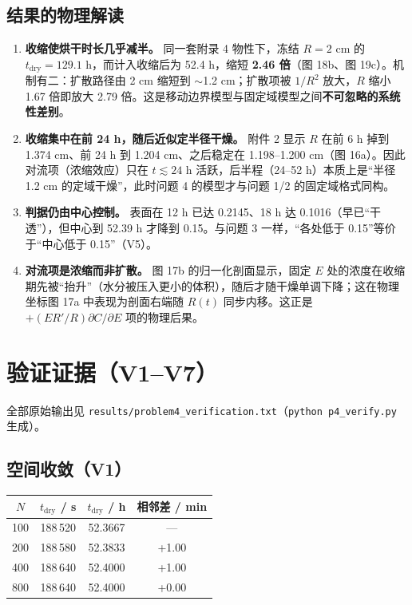 \documentclass[11pt]{ctexart}
\begin{document}
\subsection{结果的物理解读}

\begin{enumerate}
\item \textbf{收缩使烘干时长几乎减半。} 同一套附录 4 物性下，冻结 $R=2$ cm 的 $t_\text{dry}=129.1$ h，而计入收缩后为 52.4 h，缩短 \textbf{2.46 倍}（图 18b、图 19c）。机制有二：扩散路径由 2 cm 缩短到 $\sim$1.2 cm；扩散项被 $1/R^2$ 放大，$R$ 缩小 1.67 倍即放大 2.79 倍。这是移动边界模型与固定域模型之间\textbf{不可忽略的系统性差别}。

\item \textbf{收缩集中在前 24 h，随后近似定半径干燥。} 附件 2 显示 $R$ 在前 6 h 掉到 1.374 cm、前 24 h 到 1.204 cm、之后稳定在 1.198--1.200 cm（图 16a）。因此对流项（浓缩效应）只在 $t\lesssim24$ h 活跃，后半程（24--52 h）本质上是``半径 1.2 cm 的定域干燥''，此时问题 4 的模型才与问题 1/2 的固定域格式同构。

\item \textbf{判据仍由中心控制。} 表面在 12 h 已达 0.2145、18 h 达 0.1016（早已``干透''），但中心到 52.39 h 才降到 0.15。与问题 3 一样，``各处低于 0.15''等价于``中心低于 0.15''（V5）。

\item \textbf{对流项是浓缩而非扩散。} 图 17b 的归一化剖面显示，固定 $E$ 处的浓度在收缩期先被``抬升''（水分被压入更小的体积），随后才随干燥单调下降；这在物理坐标图 17a 中表现为剖面右端随 $R(t)$ 同步内移。这正是 $+(E R'/R)\partial C/\partial E$ 项的物理后果。
\end{enumerate}

\section{验证证据（V1--V7）}

全部原始输出见 \texttt{results/problem4\_verification.txt}（\texttt{python p4\_verify.py} 生成）。

\subsection{空间收敛（V1）}

\begin{center}
\begin{tabular}{cccc}
\toprule
$N$ & $t_\text{dry}$ / s & $t_\text{dry}$ / h & 相邻差 / min \\
\midrule
100 & 188\,520 & 52.3667 & — \\
200 & 188\,580 & 52.3833 & +1.00 \\
400 & 188\,640 & 52.4000 & +1.00 \\
800 & 188\,640 & 52.4000 & +0.00 \\
\bottomrule
\end{tabular}
\end{center}
\end{document}
